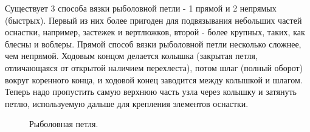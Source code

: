Существует 3 способа вязки рыболовной петли - 1 прямой и 2 непрямых (быстрых). Первый из них более пригоден для подвязывания небольших частей оснастки, например, застежек и вертлюжков, второй - более крупных, таких, как блесны и воблеры. Прямой способ вязки рыболовной петли несколько сложнее, чем непрямой. Ходовым концом делается колышка (закрытая петля, отличающаяся от открытой наличием перехлеста), потом шлаг (полный оборот) вокруг коренного конца, и ходовой конец заводится между колышкой и шлагом. Теперь надо пропустить самую верхнюю часть узла через колышку и затянуть петлю, используемую дальше для крепления элементов оснастки.

\begin{figure}[H]\centering
\end{figure}

\begin{figure}[H]\centering
\end{figure}

\begin{figure}[H]\centering
\end{figure}

\begin{figure}[H]\centering
	\subfloat[Результат]{\label{ris:Fish_Loop_4}
	\tcbox[enhanced jigsaw,colframe=black,opacityframe=0.5,opacityback=0.5]
		{\centering
			}
		}
\end{figure}

\begin{figure}[H]\centering
	\caption{Рыболовная петля.}\label{ris:Fish_Loop}
\end{figure}

